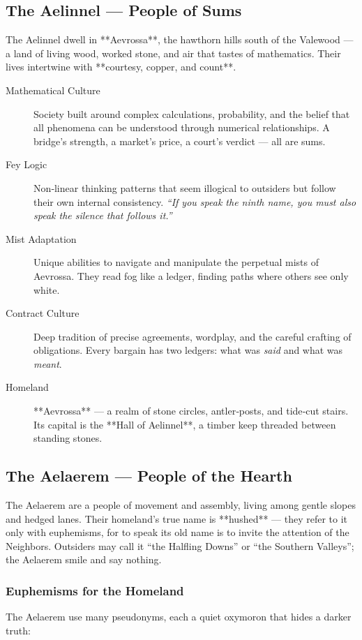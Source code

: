\subsection*{The Aelinnel — People of Sums}
\label{subsec:aelinnel}

The Aelinnel dwell in **Aevrossa**, the hawthorn hills south of the Valewood — a land of living wood, worked stone, and air that tastes of mathematics. Their lives intertwine with **courtesy, copper, and count**.

\begin{description}
\item[Mathematical Culture] Society built around complex calculations, probability, and the belief that all phenomena can be understood through numerical relationships. A bridge’s strength, a market’s price, a court’s verdict — all are sums.
\item[Fey Logic] Non‑linear thinking patterns that seem illogical to outsiders but follow their own internal consistency. \emph{“If you speak the ninth name, you must also speak the silence that follows it.”}
\item[Mist Adaptation] Unique abilities to navigate and manipulate the perpetual mists of Aevrossa. They read fog like a ledger, finding paths where others see only white.
\item[Contract Culture] Deep tradition of precise agreements, wordplay, and the careful crafting of obligations. Every bargain has two ledgers: what was \emph{said} and what was \emph{meant}.
\item[Homeland] **Aevrossa** — a realm of stone circles, antler‑posts, and tide‑cut stairs. Its capital is the **Hall of Aelinnel**, a timber keep threaded between standing stones.
\end{description}

\subsection*{The Aelaerem — People of the Hearth}
\label{subsec:aelaerem}

The Aelaerem are a people of movement and assembly, living among gentle slopes and hedged lanes. Their homeland’s true name is **hushed** — they refer to it only with euphemisms, for to speak its old name is to invite the attention of the Neighbors. Outsiders may call it “the Halfling Downs” or “the Southern Valleys”; the Aelaerem smile and say nothing.

\subsubsection*{Euphemisms for the Homeland}
The Aelaerem use many pseudonyms, each a quiet oxymoron that hides a darker truth:

